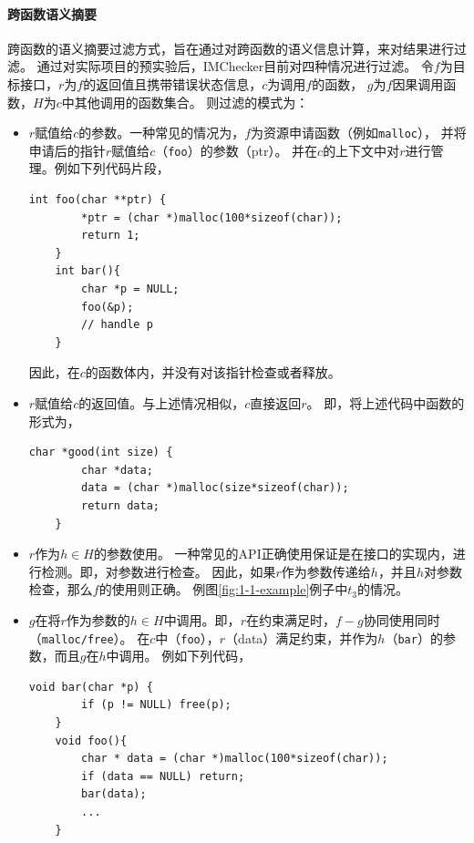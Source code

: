 \paragraph{跨函数语义摘要}
跨函数的语义摘要过滤方式，旨在通过对跨函数的语义信息计算，来对结果进行过滤。
通过对实际项目的预实验后，IMChecker目前对四种情况进行过滤。
令$f$为目标接口，$r$为$f$的返回值且携带错误状态信息，$c$为调用$f$的函数，
$g$为$f$因果调用函数，$H$为$c$中其他调用的函数集合。
则过滤的模式为：
\begin{itemize}
	\item $r$赋值给$c$的参数。一种常见的情况为，$f$为资源申请函数（例如\texttt{malloc}），
	并将申请后的指针$r$赋值给$c$（\texttt{foo}）的参数（ptr）。
	并在$c$的上下文中对$r$进行管理。例如下列代码片段，
	\begin{lstlisting}[language={[ANSI]C},
	basicstyle=\linespread{0.7}\listingsfont,
	numbers=none,
	xleftmargin=.15\textwidth]
	int foo(char **ptr) {
		*ptr = (char *)malloc(100*sizeof(char));
		return 1;
	}
	int bar(){
		char *p = NULL;
		foo(&p);
		// handle p
	}
	\end{lstlisting}
	因此，在$c$的函数体内，并没有对该指针检查或者释放。
	\item $r$赋值给$c$的返回值。与上述情况相似，$c$直接返回$r$。
	即，将上述代码中函数的形式为，
		\begin{lstlisting}[language={[ANSI]C},
	basicstyle=\linespread{0.7}\listingsfont,
	numbers=none,
	xleftmargin=.15\textwidth]
	char *good(int size) {
		char *data;
		data = (char *)malloc(size*sizeof(char));
		return data;	
	}
	\end{lstlisting}
	\item $r$作为$h \in H$的参数使用。
	一种常见的API正确使用保证是在接口的实现内，进行检测。即，对参数进行检查。
	因此，如果$r$作为参数传递给$h$，并且$h$对参数检查，那么$f$的使用则正确。
	例图\ref{fig:1-1-example}例子中$t_3$的情况。
	\item $g$在将$r$作为参数的$h \in H$中调用。即，$r$在约束满足时，$f-g$协同使用同时（\texttt{malloc/free}）。
	在$c$中（\texttt{foo}），$r$（data）满足约束，并作为$h$（\texttt{bar}）的参数，而且$g$在$h$中调用。
	例如下列代码，
			\begin{lstlisting}[language={[ANSI]C},
	basicstyle=\linespread{0.7}\listingsfont,
	numbers=none,
	xleftmargin=.15\textwidth]
	void bar(char *p) {
		if (p != NULL) free(p);
	}
	void foo(){
		char * data = (char *)malloc(100*sizeof(char));
		if (data == NULL) return;
		bar(data);
	    ...
	}
	\end{lstlisting}
	
\end{itemize}

